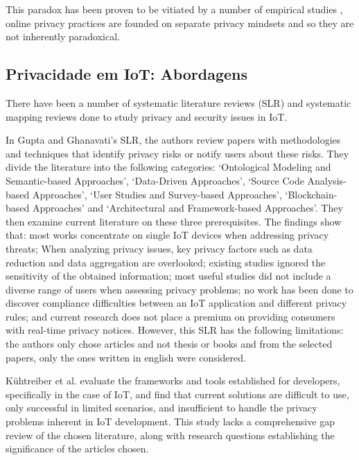 \documentclass[conference]{IEEEtran}
\begin{document}
This paradox has been proven to be vitiated by a number of empirical studies \cite{dienlin2015privacy, xie2019consumers, SCHWAIG20131, sannon2018privacy},
online privacy practices are founded on separate privacy mindsets and so
they are not inherently paradoxical.

\subsection{Privacidade em IoT: Abordagens}

There have been a number of systematic literature reviews (SLR) \cite{Gupta2022Privacy, Kuhtreiber2022survey, sicari2015security, LinSurvey}
and systematic mapping reviews \cite{porras2018security, ahmed2019aspects}
done to study privacy and security issues in IoT.

In Gupta and Ghanavati's \cite{Gupta2022Privacy} SLR, the authors review
papers with methodologies and techniques that identify privacy risks or
notify users about these risks. They divide the literature into the following
categories: `Ontological Modeling and Semantic-based Approaches', `Data-Driven
Approaches', `Source Code Analysis-based Approaches', `User Studies and
Survey-based Approaches', `Blockchain-based Approaches' and `Architectural
and Framework-based Approaches'. They then examine current literature on
these three prerequisites. The findings show that: most works concentrate
on single IoT devices when addressing privacy threats; When analyzing privacy
issues, key privacy factors such as data reduction and data aggregation
are overlooked; existing studies ignored the sensitivity of the obtained
information; most useful studies did not include a diverse range of users
when assessing privacy problems; no work has been done to discover compliance
difficulties between an IoT application and different privacy rules; and
current research does not place a premium on providing consumers with real-time
privacy notices. However, this SLR has the following limitations: the authors
only chose articles and not thesis or books and from the selected papers,
only the ones written in english were considered.

Kühtreiber et al. \cite{Kuhtreiber2022survey} evaluate the frameworks and
tools established for developers, specifically in the case of IoT, and find
that current solutions are difficult to use, only successful in limited
scenarios, and insufficient to handle the privacy problems inherent in IoT
development. This study lacks a comprehensive gap review of the chosen
literature, along with research questions establishing the significance
of the articles chosen.
\end{document}
